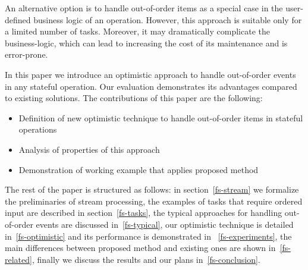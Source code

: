 An alternative option is to handle out-of-order items as a special case in the user-defined business logic of an operation. However, this approach  is suitable only for a limited number of tasks. Moreover, it may dramatically complicate the business-logic, which can lead to increasing the cost of its maintenance and is error-prone.

In this paper we introduce  an optimistic approach to handle out-of-order events in any stateful operation. Our evaluation  demonstrates its advantages compared to existing solutions. The contributions of this paper are the following: 

\begin {itemize}
\item Definition of new optimistic technique to handle out-of-order items in stateful operations
\item Analysis  of properties of this approach
\item Demonstration of working example that applies proposed method
\end {itemize}

The rest of the paper is structured as follows: in section~\ref{fs-stream} we formalize the preliminaries of stream processing, the examples of tasks that require ordered input are described in section~\ref{fs-tasks}, the typical approaches for handling out-of-order events are discussed in~\ref{fs-typical}, our optimistic technique is detailed in~\ref{fs-optimistic} and its performance is demonstrated in ~\ref{fs-experiments}, the main differences between proposed method and existing ones are shown in~\ref{fs-related}, finally we discuss the results and our plans in~\ref{fs-conclusion}.
